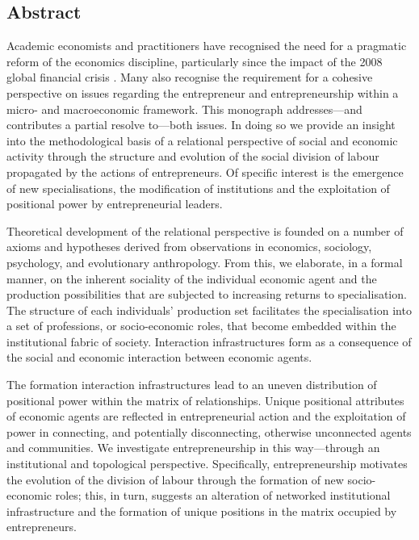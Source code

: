 \documentclass[11pt,fleqn]{book}
\begin{document}
\begin{singlespace}
\setcounter{tocdepth}{2}
\tableofcontents

\listoffigures

\chapter*{Abstract}


Academic economists and practitioners have recognised the need for a pragmatic reform of the economics discipline, particularly since the impact of the 2008 global financial crisis \citep{Hodgson2009}. Many also recognise the requirement for a cohesive perspective on issues regarding the entrepreneur and entrepreneurship within a micro- and macroeconomic framework. This monograph addresses---and contributes a partial resolve to---both issues. In doing so we provide an insight into the methodological basis of a relational perspective of social and economic activity through the structure and evolution of the social division of labour propagated by the actions of entrepreneurs. Of specific interest is the emergence of new specialisations, the modification of institutions and the exploitation of positional power by entrepreneurial leaders.

Theoretical development of the relational perspective is founded on a number of axioms and hypotheses derived from observations in economics, sociology, psychology, and evolutionary anthropology. From this, we elaborate, in a formal manner, on the inherent sociality of the individual economic agent and the production possibilities that are subjected to increasing returns to specialisation. The structure of each individuals' production set facilitates the specialisation into a set of professions, or socio-economic roles, that become embedded within the institutional fabric of society. Interaction infrastructures form as a consequence of the social and economic interaction between economic agents.

The formation interaction infrastructures lead to an uneven distribution of positional power within the matrix of relationships. Unique positional attributes of economic agents are reflected in entrepreneurial action and the exploitation of power in connecting, and potentially disconnecting, otherwise unconnected agents and communities. We investigate entrepreneurship in this way---through an institutional and topological perspective. Specifically, entrepreneurship motivates the evolution of the division of labour through the formation of new socio-economic roles; this, in turn, suggests an alteration of networked institutional infrastructure and the formation of unique positions in the matrix occupied by entrepreneurs.


\end{singlespace}
\end{document}
